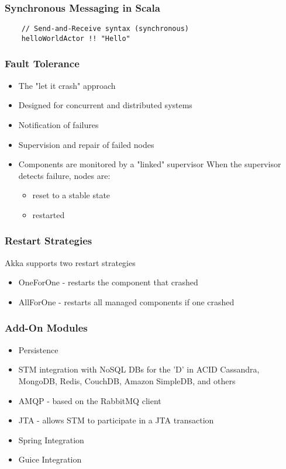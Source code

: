 \documentclass{beamer}
\begin{document}
\begin{frame}[fragile]
  \frametitle{Synchronous Messaging in Scala}

  \begin{lstlisting}
    // Send-and-Receive syntax (synchronous)
    helloWorldActor !! "Hello"
  \end{lstlisting}
\end{frame}



\frame
    {
      \frametitle{Fault Tolerance}
      \begin{itemize}
      \item The "let it crash" approach
      \item Designed for concurrent and distributed systems
      \item Notification of failures
      \item Supervision and repair of failed nodes
      \item Components are monitored by a "linked" supervisor
        When the supervisor detects failure, nodes are:
        \begin{itemize}
        \item reset to a stable state
        \item restarted
        \end{itemize}
      \end{itemize}
    }

\frame
{
  \frametitle{Restart Strategies}
  Akka supports two restart strategies
  \begin{itemize}
  \item OneForOne - restarts the component that crashed
  \item AllForOne - restarts all managed components if one crashed
  \end{itemize}
}

\frame
{
  \frametitle{Add-On Modules}
  \begin{itemize}
  \item Persistence
  \item STM integration with NoSQL DBs for the 'D' in ACID
    Cassandra, MongoDB, Redis, CouchDB, Amazon SimpleDB,
    and others
  \item AMQP - based on the RabbitMQ client
  \item JTA - allows STM to participate in a JTA transaction
  \item Spring Integration
  \item Guice Integration
  \end{itemize}
}
\end{document}
